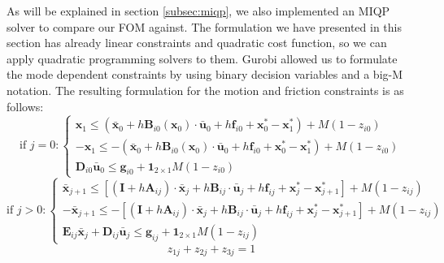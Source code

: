 \documentclass[12,twoside]{TFG-GM}
\theoremstyle{definition}
\theoremstyle{remark}
\newcommand*\diff[1]{\bar{#1}}
\begin{document}
As will be explained in section \ref{subsec:miqp}, we also implemented an MIQP solver to compare our FOM against. The formulation we have presented in this section has already linear constraints and quadratic cost function, so we can apply quadratic programming solvers to them. Gurobi allowed us to formulate the mode dependent constraints by using binary decision variables and a big-M notation. The resulting formulation for the motion and friction constraints is as follows: 
\begin{equation} \label{eq:big_m_first_step}
\text{if } j = 0: \begin{cases}

\textbf{x}_1 \leq (\diff{\textbf{x}}_0 +  h \textbf{B}_{i0}(\textbf{x}_0) \cdot \diff{\textbf{u}}_0 + h \textbf{f}_{i0} + \textbf{x}_0^* - \textbf{x}_1^*) + M (1 - z_{i0})\\

-\textbf{x}_1 \leq -(\diff{\textbf{x}}_0 +  h \textbf{B}_{i0}(\textbf{x}_0) \cdot \diff{\textbf{u}}_0 + h \textbf{f}_{i0} + \textbf{x}_0^* - \textbf{x}_1^*) + M (1 - z_{i0})\\

\textbf{D}_{i0} \diff{\textbf{u}}_0 \leq \textbf{g}_{i0} + \textbf{1}_{2\times1}M(1 - z_{i0})
\end{cases}
\end{equation}
\begin{equation} \label{eq:big_m_other_steps}
\text{if } j > 0: \begin{cases}

\diff{\textbf{x}}_{j+1} \leq [(\textbf{I} + h \textbf{A}_{ij})\cdot \diff{\textbf{x}}_j + h \textbf{B}_{ij} \cdot \diff{\textbf{u}}_j + h \textbf{f}_{ij}  + \textbf{x}_{j}^* - \textbf{x}_{j+1}^*] + M(1-z_{ij})\\

-\diff{\textbf{x}}_{j+1} \leq -[(\textbf{I} + h \textbf{A}_{ij})\cdot \diff{\textbf{x}}_j + h \textbf{B}_{ij} \cdot \diff{\textbf{u}}_j + h \textbf{f}_{ij}  + \textbf{x}_{j}^* - \textbf{x}_{j+1}^*] + M(1-z_{ij})\\

\textbf{E}_{ij} \diff{\textbf{x}}_j + \textbf{D}_{ij} \diff{\textbf{u}}_j \leq \textbf{g}_{ij} + \textbf{1}_{2\times1}M(1 - z_{ij})
\end{cases}
\end{equation}
\begin{equation} \label{eq:binary_const}
z_{1j} + z_{2j} + z_{3j} = 1
\end{equation}
\end{document}
